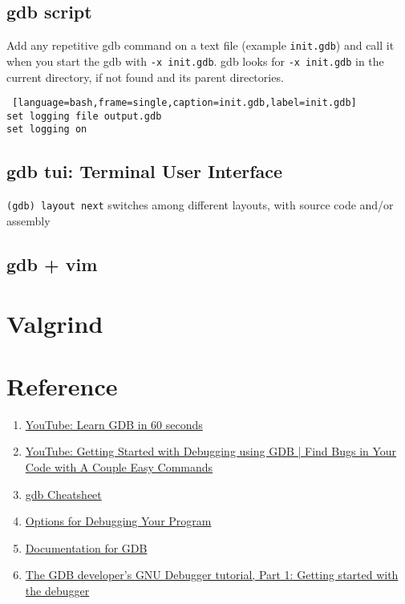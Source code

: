 \subsection{gdb script}

Add any repetitive gdb command on a text file (example \texttt{init.gdb}) and call it when you start the gdb with \texttt{-x init.gdb}.
gdb looks for \texttt{-x init.gdb} in the current directory, if not found and its parent directories.

\begin{lstlisting} [language=bash,frame=single,caption=init.gdb,label=init.gdb]
set logging file output.gdb
set logging on
\end{lstlisting}

\subsection{gdb tui: Terminal User Interface}
\texttt{(gdb) layout next} switches among different layouts, with source code and/or assembly


\subsection{gdb + vim}

\section{Valgrind}


\section{Reference}
\begin{enumerate}
  \item \href{https://www.youtube.com/watch?v=mfmXcbiRs0E&list=PL9IEJIKnBJjHGWPN_S9NS_Ky1-tC8ZrUI}{YouTube: Learn GDB in 60 seconds}

  \item \href{https://www.youtube.com/watch?v=Dq8l1_-QgAc}{YouTube: Getting Started with Debugging using GDB | Find Bugs in Your Code with A Couple Easy Commands}

  \item \href{https://www.google.com/url?q=https://cs.brown.edu/courses/cs033/docs/guides/gdb.pdf&sa=D&source=docs&ust=1661288718090053&usg=AOvVaw3EbYRk1zHStEJlu-FSbeiY}{gdb Cheatsheet}

  \item \href{https://gcc.gnu.org/onlinedocs/gcc/index.html#toc-GCC-Command-Options}{Options for Debugging Your Program}

  \item \href{https://sourceware.org/gdb/download/onlinedocs/}{Documentation for GDB}

  \item \href{https://developers.redhat.com/blog/2021/04/30/the-gdb-developers-gnu-debugger-tutorial-part-1-getting-started-with-the-debugger#}{The GDB developer's GNU Debugger tutorial, Part 1: Getting started with the debugger}
\end{enumerate}
